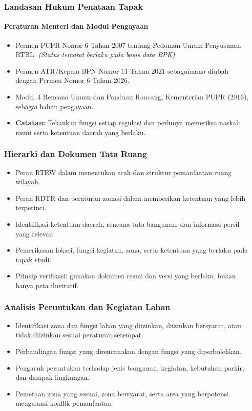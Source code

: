 \documentclass[../main.tex]{subfiles}
\begin{document}
\begin{frame}[mytitle=standard, t, mycolor=white]
	\frametitle{Landasan Hukum Penataan Tapak}
	\framesubtitle{Peraturan Menteri dan Modul Pengayaan}
	\begin{itemize}
		\item Permen PUPR Nomor 6 Tahun 2007 tentang Pedoman Umum Penyusunan RTBL. \textit{(Status tercatat berlaku pada basis data BPK)}
		\item Permen ATR/Kepala BPN Nomor 11 Tahun 2021 sebagaimana diubah dengan Permen Nomor 6 Tahun 2026.
		\item Modul 4 Rencana Umum dan Panduan Rancang, Kementerian PUPR (2016), sebagai bahan pengayaan.
		\item \textbf{Catatan:} Tekankan fungsi setiap regulasi dan perlunya memeriksa naskah resmi serta ketentuan daerah yang berlaku.
	\end{itemize}
\end{frame}

\begin{frame}[mytitle=imageplus, c, mycolor=digiPH_gray]
	\frametitle{Hierarki dan Dokumen Tata Ruang}
	\begin{itemize}
		\item Peran RTRW dalam menentukan arah dan struktur pemanfaatan ruang wilayah.
		\item Peran RDTR dan peraturan zonasi dalam memberikan ketentuan yang lebih terperinci.
		\item Identifikasi ketentuan daerah, rencana tata bangunan, dan informasi persil yang relevan.
		\item Pemeriksaan lokasi, fungsi kegiatan, zona, serta ketentuan yang berlaku pada tapak studi.
		\item Prinsip verifikasi: gunakan dokumen resmi dan versi yang berlaku, bukan hanya peta ilustratif.
	\end{itemize}
\end{frame}

\begin{frame}[mytitle=standard, t, mycolor=white]
	\frametitle{Analisis Peruntukan dan Kegiatan Lahan}
	\begin{itemize}
		\item Identifikasi zona dan fungsi lahan yang diizinkan, diizinkan bersyarat, atau tidak diizinkan sesuai peraturan setempat.
		\item Perbandingan fungsi yang direncanakan dengan fungsi yang diperbolehkan.
		\item Pengaruh peruntukan terhadap jenis bangunan, kegiatan, kebutuhan parkir, dan dampak lingkungan.
		\item Pemetaan zona yang sesuai, zona bersyarat, serta area yang berpotensi mengalami konflik pemanfaatan.
	\end{itemize}
\end{frame}
\end{document}
